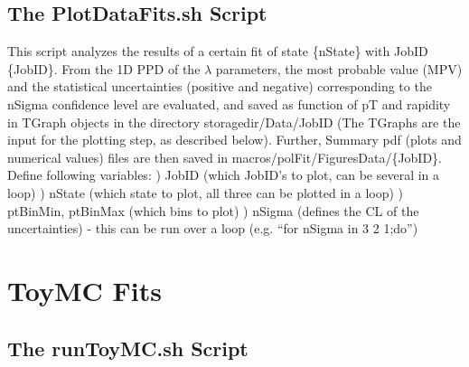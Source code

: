 \documentclass{article}
\begin{document}
\subsection{The PlotDataFits.sh Script}

This script analyzes the results of a certain fit of state \{nState\} with JobID \{JobID\}. From the 1D PPD of the $\lambda$ parameters, the most probable value (MPV) and the statistical uncertainties (positive and negative) corresponding to the nSigma confidence level are evaluated, and saved as function of pT and rapidity in TGraph objects in the directory storagedir/Data/JobID (The TGraphs are the input for the plotting step, as described below).
Further, Summary pdf (plots and numerical values) files are then saved in macros/polFit/FiguresData/\{JobID\}. Define following variables:
\newline *) JobID (which JobID's to plot, can be several in a loop)
\newline *) nState (which state to plot, all three can be plotted in a loop)
\newline *) ptBinMin, ptBinMax (which bins to plot)
\newline *) nSigma (defines the CL of the uncertainties) - this can be run over a loop (e.g. ``for nSigma in 3 2 1;do'')

\section{ToyMC Fits}

\subsection{The runToyMC.sh Script}
\end{document}
